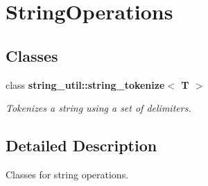 \section{String\+Operations}
\label{group___string_operations}
\subsection*{Classes}
\begin{DoxyCompactItemize}
\item 
class {\bf string\+\_\+util\+::string\+\_\+tokenize$<$ T $>$}
\begin{DoxyCompactList}\small\item\em Tokenizes a string using a set of delimiters. \end{DoxyCompactList}\end{DoxyCompactItemize}


\subsection{Detailed Description}
Classes for string operations. 
